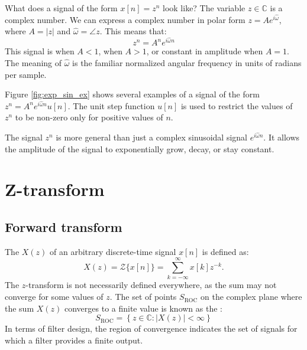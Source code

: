 What does a signal of the form $x[n]=z^n$ look like? The variable
$z\in \mathbb{C}$ is a complex number. We can express a complex number
in polar form $z=A e^{i\hat{\omega}}$, where $A=|z|$ and
$\hat{\omega} = \angle z$. This means that:
\begin{equation}
  \boxed{
    z^{n}=A^n e^{i \hat{\omega} n}
  }
\end{equation}
This signal is 
when $A<1$,  when
$A>1$, or constant in amplitude when $A=1$. The meaning of
$\hat{\omega}$ is the familiar normalized angular frequency in units
of radians per sample.

Figure \ref{fig:exp_sin_ex} shows several examples of a signal of the
form $z^{n}=A^n e^{i \hat{\omega} n} u[n]$. The unit step function
$u[n]$ is used to restrict the values of $z^n$ to be non-zero
only for positive values of $n$.

The signal $z^{n}$ is more general than just a complex sinusoidal
signal $e^{i \hat{\omega} n}$. It allows the amplitude of the signal to
exponentially grow, decay, or stay constant.


\section{Z-transform}
\usetikzlibrary{arrows,positioning}

\subsection*{Forward transform}
The  $X(z)$ of an arbitrary discrete-time signal $x[n]$ is
defined as:
\begin{equation}
  \boxed{
    X(z) = \mathcal{Z}\{x[n]\} = \sum_{k=-\infty}^{\infty} x[k] z^{-k}.}
  \label{zf}
\end{equation}
The $z$-transform is not necessarily defined everywhere, as the sum
may not converge for some values of $z$. The set of points
$S_{\mathrm{ROC}}$ on the complex plane where the sum $X(z)$ converges
to a finite value is known as the \emph{}:
\begin{equation}
  S_{\mathrm{ROC}} = \left\{z \in \mathbb{C} :  |X(z)| < \infty\right\}
\end{equation}
In terms of filter design, the region of convergence indicates the set
of signals for which a filter provides a finite output.

